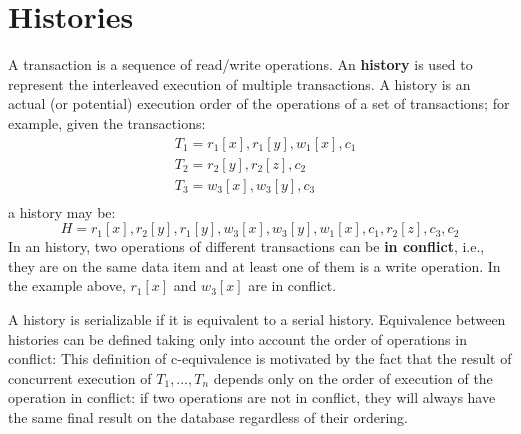 \section{Histories}

A transaction is a sequence of read/write operations. An \textbf{history} is used to represent the interleaved execution of multiple transactions.
A history is an actual (or potential) execution order of the operations of a set of transactions; for example, given the transactions:
\begin{align*}
    &T_1 = r_1[x], r_1[y], w_1[x], c_1 \\
    &T_2 = r_2[y], r_2[z], c_2 \\
    &T_3 = w_3[x], w_3[y], c_3 \\
\end{align*}
a history may be:
\begin{equation*}
    H = r_1[x], r_2[y], r_1[y], w_3[x], w_3[y], w_1[x], c_1, r_2[z], c_3, c_2
\end{equation*}
In an history, two operations of different transactions can be \textbf{in conflict}, i.e., they are on the same data item and at least one of them is a write operation. In the example above, $r_1[x]$ and $w_3[x]$ are in conflict.

A history is serializable if it is equivalent to a serial history. Equivalence between histories can be defined taking only into account the order of operations in conflict:
This definition of c-equivalence is motivated by the fact that the result of concurrent execution of $T_1,\dots,T_n$ depends only on the order of execution of the operation in conflict: if two operations are not in conflict, they will always have the same final result on the database regardless of their ordering.

